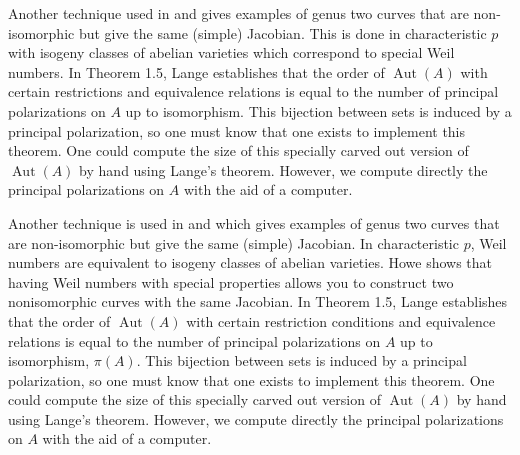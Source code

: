 \documentclass[12pt,reqno]{amsart}
\DeclareMathOperator{\Aut}{Aut}
\newcommand{\Q}{\mathbb{Q}}
\theoremstyle{definition}
\theoremstyle{remark}
\newtheorem*{remark}{Remark}
\begin{document}
Another technique used in \cite{howe1} and \cite{howe2} gives examples of genus two curves that are non-isomorphic but give the same (simple) Jacobian. This is done in characteristic $p$ with isogeny classes of abelian varieties which correspond to special Weil numbers. In \cite{several} Theorem 1.5, Lange establishes that the order of $\Aut(A)$ with certain restrictions and equivalence relations is equal to the number of principal polarizations on $A$ up to isomorphism. This bijection between sets is induced by a principal polarization, so one must know that one exists to implement this theorem. One could compute the size of this specially carved out version of $\Aut(A)$ by hand using Lange's theorem. However, we compute directly the principal polarizations on $A$ with the aid of a computer.

Another technique is used in \cite{howe1} and \cite{howe2} which gives examples of genus two curves that are non-isomorphic but give the same (simple) Jacobian. In characteristic $p$, Weil numbers are equivalent to isogeny classes of abelian varieties. Howe shows that having Weil numbers with special properties allows you to construct two nonisomorphic curves with the same Jacobian. In \cite{several} Theorem 1.5, Lange establishes that the order of $\Aut(A)$ with certain restriction conditions and equivalence relations is equal to the number of principal polarizations on $A$ up to isomorphism, $\pi(A)$. This bijection between sets is induced by a principal polarization, so one must know that one exists to implement this theorem. One could compute the size of this specially carved out version of $\Aut(A)$ by hand using Lange's theorem. However, we compute directly the principal polarizations on $A$ with the aid of a computer.


\end{document}

